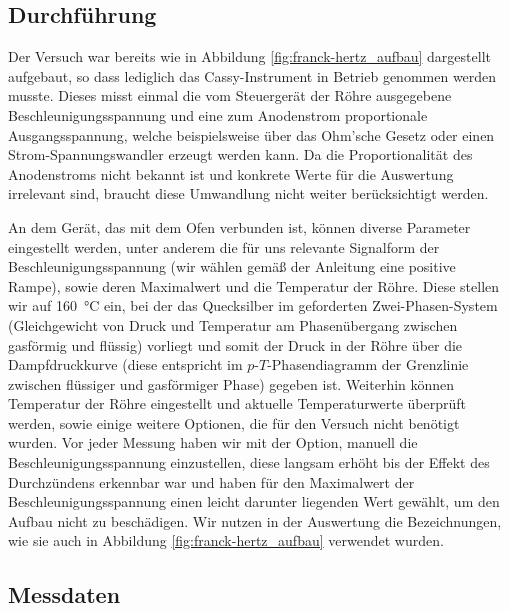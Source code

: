 \documentclass[11pt, a4paper]{article}
\begin{document}
\subsection{Durchführung}

Der Versuch war bereits  wie in Abbildung \ref{fig:franck-hertz_aufbau} dargestellt aufgebaut, so dass lediglich das Cassy-Instrument in Betrieb genommen werden musste.
Dieses misst einmal die vom Steuergerät der Röhre ausgegebene Beschleunigungsspannung und eine zum Anodenstrom proportionale Ausgangsspannung, welche beispielsweise über das Ohm'sche Gesetz oder einen Strom-Spannungswandler erzeugt werden kann.
Da die Proportionalität des Anodenstroms nicht bekannt ist und konkrete Werte für die Auswertung irrelevant sind, braucht diese Umwandlung nicht weiter berücksichtigt werden.

An dem Gerät, das mit dem Ofen verbunden ist, können diverse Parameter eingestellt werden, unter anderem die für uns relevante Signalform der Beschleunigungsspannung (wir wählen gemäß der Anleitung eine positive Rampe), sowie deren Maximalwert und die Temperatur der Röhre.
Diese stellen wir auf \SI{160}{\degreeCelsius} ein, bei der das Quecksilber im geforderten Zwei-Phasen-System (Gleichgewicht von Druck und Temperatur am Phasenübergang zwischen gasförmig und flüssig) vorliegt und somit der Druck in der Röhre über die Dampfdruckkurve (diese entspricht im $p$-$T$-Phasendiagramm der Grenzlinie zwischen flüssiger und gasförmiger Phase) gegeben ist.
Weiterhin können Temperatur der Röhre eingestellt und aktuelle Temperaturwerte überprüft werden, sowie einige weitere Optionen, die für den Versuch nicht benötigt wurden.
Vor jeder Messung haben wir mit der Option, manuell die Beschleunigungsspannung einzustellen, diese langsam erhöht bis der Effekt des Durchzündens erkennbar war und haben für den Maximalwert der Beschleunigungsspannung einen leicht darunter liegenden Wert gewählt, um den Aufbau nicht zu beschädigen.
Wir nutzen in der Auswertung die Bezeichnungen, wie sie auch in Abbildung \ref{fig:franck-hertz_aufbau} verwendet wurden.

\subsection{Messdaten}
\end{document}
